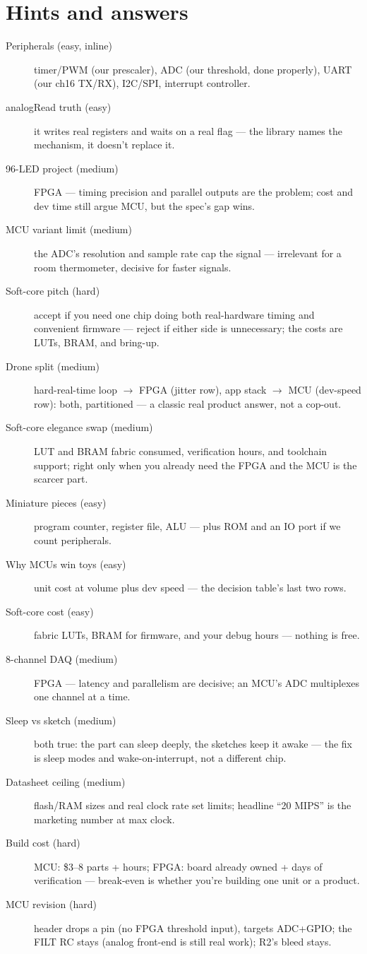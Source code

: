 \section*{Hints and answers}
\begin{description}
\item[Peripherals (easy, inline)] timer/PWM (our prescaler), ADC
(our threshold, done properly), UART (our ch16 TX/RX), I2C/SPI,
interrupt controller.
\item[analogRead truth (easy)] it writes real registers and waits
on a real flag --- the library names the mechanism, it doesn't
replace it.
\item[96-LED project (medium)] FPGA --- timing precision and
parallel outputs are the problem; cost and dev time still argue
MCU, but the spec's gap wins.
\item[MCU variant limit (medium)] the ADC's resolution and sample
rate cap the signal --- irrelevant for a room thermometer,
decisive for faster signals.
\item[Soft-core pitch (hard)] accept if you need one chip doing
both real-hardware timing and convenient firmware --- reject if
either side is unnecessary; the costs are LUTs, BRAM, and bring-up.
\item[Drone split (medium)] hard-real-time loop $\to$ FPGA (jitter
row), app stack $\to$ MCU (dev-speed row): both, partitioned ---
a classic real product answer, not a cop-out.
\item[Soft-core elegance swap (medium)] LUT and BRAM fabric
consumed, verification hours, and toolchain support; right only
when you already need the FPGA and the MCU is the scarcer part.
\item[Miniature pieces (easy)] program counter, register file,
ALU --- plus ROM and an I\/O port if we count peripherals.
\item[Why MCUs win toys (easy)] unit cost at volume plus dev
speed --- the decision table's last two rows.
\item[Soft-core cost (easy)] fabric LUTs, BRAM for firmware, and
your debug hours --- nothing is free.
\item[8-channel DAQ (medium)] FPGA --- latency and parallelism are
decisive; an MCU's ADC multiplexes one channel at a time.
\item[Sleep vs sketch (medium)] both true: the part can sleep
deeply, the sketches keep it awake --- the fix is sleep modes and
wake-on-interrupt, not a different chip.
\item[Datasheet ceiling (medium)] flash/RAM sizes and real clock
rate set limits; headline ``20 MIPS'' is the marketing number at
max clock.
\item[Build cost (hard)] MCU: \$3--8 parts + hours; FPGA: board
already owned + days of verification --- break-even is whether
you're building one unit or a product.
\item[MCU revision (hard)] header drops a pin (no FPGA threshold
input), targets ADC+GPIO; the FILT RC stays (analog front-end is
still real work); R2's bleed stays.
\end{description}

